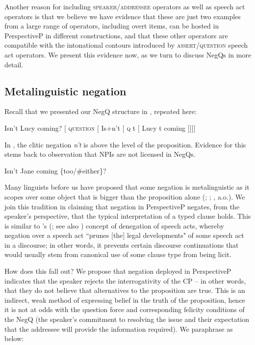 \documentclass[output=paper,colorlinks,citecolor=brown]{langscibook}
\begin{document}
Another reason for including \textsc{speaker}/\textsc{addressee} operators as well as speech act operators is that we believe we have evidence that these are just two examples from a large range of operators, including overt items, can be hosted in PerspectiveP in different constructions, and that these other operators are compatible with the intonational contours introduced by \textsc{assert}/\textsc{question} speech act operators. We present this evidence now, as we turn to discuss NegQs in more detail.

\subsection{Metalinguistic negation}\label{sect:metalingneg}

Recall that we presented our NegQ structure in , repeated here:

\begin{exe}
\begin{xlist}
\ex Isn't Lucy coming?
 \ex $[$ \textsc{question} $[$ Is$+$n't $[$ \textsc{q} t $[$ Lucy t coming $]]]]$
\end{xlist}
\end{exe}

In , the clitic negation \textit{n't} is above the level of the proposition. Evidence for this stems back to  observation that NPIs are not licensed in NegQs. 

\ea	 Isn't Jane coming \{too/{\#}either\}?
\z

Many linguists before us have proposed that some negation is metalinguistic as it scopes over some object that is bigger than the proposition alone (\citealt{horn1985, horn1989}; \citealt{wood2014}; \citealt{holmberg2016}, a.o.). We join this tradition in claiming that negation in PerspectiveP negates, from the speaker's perspective, that the typical interpretation of a typed clause holds. This is similar to \citeauthor{krifka2015SALT}'s (\citeyear{krifka2015SALT}; see also \citealt{cohenkrifka2014}) concept of denegation of speech acts, whereby negation over a speech act ``prunes $[$the$]$ legal developments" \citep[330]{krifka2015SALT} of some speech act in a discourse; in other words, it prevents certain discourse continuations that would usually stem from canonical use of some clause type from being licit.

How does this fall out? We propose that negation deployed in PerspectiveP indicates that the speaker rejects the interrogativity of the CP – in other words, that they do not believe that alternatives to the proposition are true. This is an indirect, weak method of expressing belief in the truth of the proposition, hence it is not at odds with the question force and corresponding felicity conditions of the NegQ (the speaker's commitment to resolving the issue and their expectation that the addressee will provide the information required). We paraphrase  as below:
\end{document}
